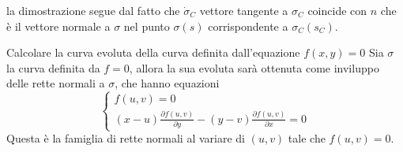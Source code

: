 \documentclass[a4paper]{article}
\begin{document}
\begin{snippetproof}{}
    la dimostrazione segue dal fatto che
    \(\dot\sigma_C\) vettore tangente a \(\sigma_C\) coincide
    con \(n\) che è il vettore normale a \(\sigma\) nel punto \(\sigma(s)\)
    corrispondente a \(\sigma_C(s_C)\).
\end{snippetproof}

\pagebreak

\begin{snippetexercise}{
    Calcolare la curva evoluta della curva definita dall'equazione \(f(x,y) = 0\)
}
    Sia \(\sigma\) la curva definita da \(f=0\), allora la sua evoluta sarà ottenuta
    come inviluppo delle rette normali a \(\sigma\), che hanno equazioni
    \[
    \begin{cases}
        f(u,v) = 0 \\
        (x-u) \frac{\partial f(u,v)}{\partial y} - (y-v) \frac{\partial f(u,v)}{\partial x} = 0
    \end{cases}
    \]
    Questa è la famiglia di rette normali al variare di \((u,v)\)
    tale che \(f(u,v) = 0\).
    

\end{snippetexercise}
\end{document}
